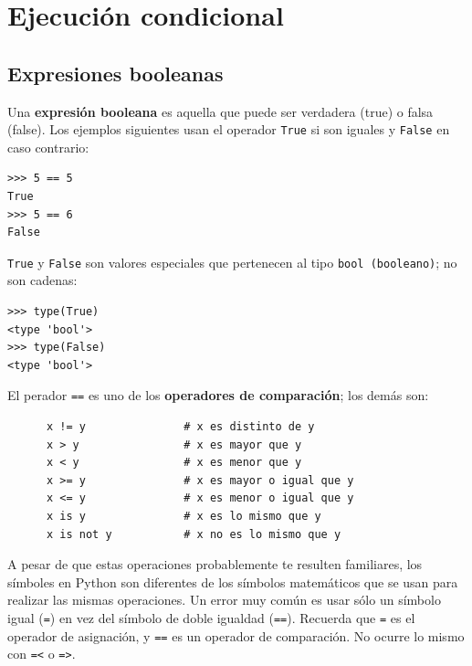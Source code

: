 
\chapter{Ejecución condicional}

\section{Expresiones booleanas}

Una {\bf expresión booleana} es aquella que puede ser verdadera (true)
o falsa (false). Los ejemplos siguientes usan el operador
{\tt True} si son iguales y {\tt False} en caso contrario:

\beforeverb
\begin{verbatim}
>>> 5 == 5
True
>>> 5 == 6
False
\end{verbatim}
\afterverb
%
{\tt True} y {\tt False} son valores especiales
que pertenecen al tipo {\tt bool (booleano)}; no son cadenas:


\beforeverb
\begin{verbatim}
>>> type(True)
<type 'bool'>
>>> type(False)
<type 'bool'>
\end{verbatim}
\afterverb
%
El perador {\tt ==} es uno de los {\bf operadores de comparación};
los demás son:

\beforeverb
\begin{verbatim}
      x != y               # x es distinto de y
      x > y                # x es mayor que y
      x < y                # x es menor que y
      x >= y               # x es mayor o igual que y
      x <= y               # x es menor o igual que y
      x is y               # x es lo mismo que y
      x is not y           # x no es lo mismo que y
\end{verbatim}
\afterverb
%
A pesar de que estas operaciones probablemente te resulten familiares, los
símboles en Python son diferentes de los símbolos matemáticos que se usan
para realizar las mismas operaciones. Un error muy común
es usar sólo un símbolo igual ({\tt =}) en vez del símbolo de doble igualdad
({\tt ==}). Recuerda que {\tt =} es el operador de asignación, y
{\tt ==} es un operador de comparación. No ocurre lo mismo con
{\tt =<} o {\tt =>}.

